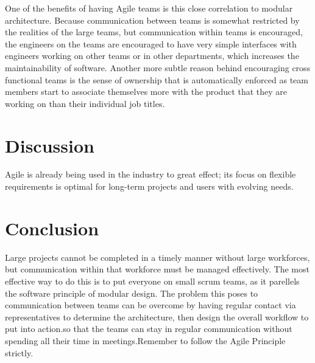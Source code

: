 \documentclass[sigplan,screen]{acmart}
\begin{document}
One of the benefits of having Agile teams is this close correlation to modular architecture. Because communication between teams is somewhat restricted by the realities of the large teams, but communication within teams is encouraged, the engineers on the teams are encouraged to have very simple interfaces with engineers working on other teams or in other departments, which increases the maintainability of software. Another more subtle reason behind encouraging cross functional teams is the sense of ownership that is automatically enforced as team members start to associate themselves more with the product that they are working on than their individual job titles.\cite{David}

\section{Discussion}
Agile is already being used in the industry to great effect; its focus on flexible requirements is optimal for long-term projects and users with evolving needs.


\section{Conclusion}
Large projects cannot be completed in a timely manner without large workforces, but communication within that workforce must be managed effectively. The most effective way to do this is to put everyone on small scrum teams, as it parellels the software principle of modular design. The problem this poses to communication between teams can be overcome by having regular contact via representatives to determine the architecture, then design the overall workflow to put into action.so that the teams can stay in regular communication without spending all their time in meetings.Remember to follow the Agile Principle strictly.





\end{document}

